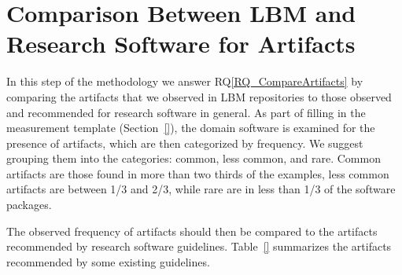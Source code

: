\documentclass[runningheads]{llncs}
\newcommand{\rqref}[1]{RQ\ref{#1}}
\begin{document}
\section{Comparison Between LBM and Research Software for Artifacts}
\label{Sec_CompareArtifacts}

In this step of the methodology we answer \rqref{RQ_CompareArtifacts} by
comparing the artifacts that we observed in LBM repositories to those observed
and recommended for research software in general.  As part of filling in the
measurement template (Section~\ref{}), the domain software is examined for the
presence of artifacts, which are then categorized by frequency. We suggest
grouping them into the categories: common, less common, and rare.  Common
artifacts are those found in more than two thirds of the examples, less common
artifacts are between 1/3 and 2/3, while rare are in less than 1/3 of the
software packages.  

The observed frequency of artifacts should then be compared to the artifacts
recommended by research software guidelines.  Table~\ref{} summarizes the
artifacts recommended by some existing guidelines.  
\end{document}
